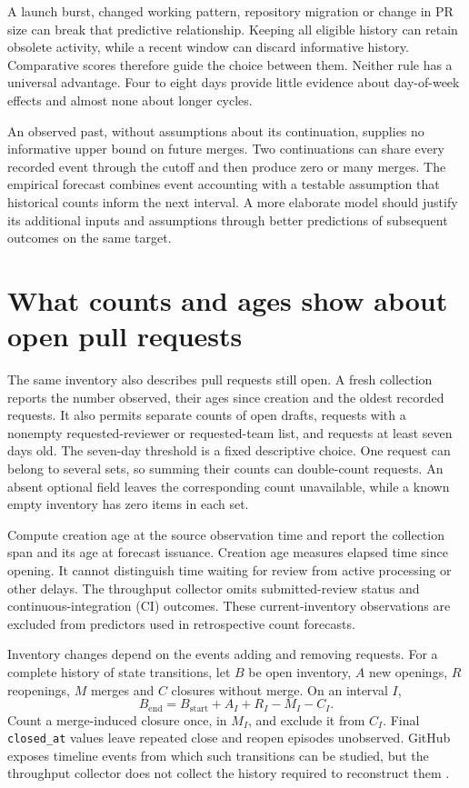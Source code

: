 \documentclass[11pt,a4paper]{article}
\begin{document}
A launch burst, changed working pattern, repository migration or change in PR size can break that predictive relationship. Keeping all eligible history can retain obsolete activity, while a recent window can discard informative history. Comparative scores therefore guide the choice between them. Neither rule has a universal advantage. Four to eight days provide little evidence about day-of-week effects and almost none about longer cycles.

An observed past, without assumptions about its continuation, supplies no informative upper bound on future merges. Two continuations can share every recorded event through the cutoff and then produce zero or many merges. The empirical forecast combines event accounting with a testable assumption that historical counts inform the next interval. A more elaborate model should justify its additional inputs and assumptions through better predictions of subsequent outcomes on the same target.

\section{What counts and ages show about open pull requests}
\label{sec:queue}

The same inventory also describes pull requests still open. A fresh collection reports the number observed, their ages since creation and the oldest recorded requests. It also permits separate counts of open drafts, requests with a nonempty requested-reviewer or requested-team list, and requests at least seven days old. The seven-day threshold is a fixed descriptive choice. One request can belong to several sets, so summing their counts can double-count requests. An absent optional field leaves the corresponding count unavailable, while a known empty inventory has zero items in each set.

Compute creation age at the source observation time and report the collection span and its age at forecast issuance. Creation age measures elapsed time since opening. It cannot distinguish time waiting for review from active processing or other delays. The throughput collector omits submitted-review status and continuous-integration (CI) outcomes. These current-inventory observations are excluded from predictors used in retrospective count forecasts.

Inventory changes depend on the events adding and removing requests. For a complete history of state transitions, let $B$ be open inventory, $A$ new openings, $R$ reopenings, $M$ merges and $C$ closures without merge. On an interval $I$,
\begin{equation}
 B_{\mathrm{end}}=B_{\mathrm{start}}+A_I+R_I-M_I-C_I.
 \label{eq:conservation}
\end{equation}
Count a merge-induced closure once, in $M_I$, and exclude it from $C_I$. Final \texttt{closed\_at} values leave repeated close and reopen episodes unobserved. GitHub exposes timeline events from which such transitions can be studied, but the throughput collector does not collect the history required to reconstruct them \citep{githubevents}.
\end{document}
